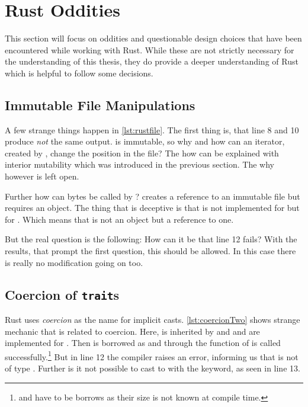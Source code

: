 \documentclass[thesis]{subfiles}
\begin{document}
\section{Rust Oddities}
  This section will focus on oddities and questionable design choices that have been encountered while working with Rust.
  While these are not strictly necessary for the understanding of this thesis, they do provide a deeper understanding of Rust which is helpful to follow some decisions.

  \subsection{Immutable File Manipulations}
    A few strange things happen in \autoref{lst:rustfile}.
    The first thing is, that line 8 and 10 produce \emph{not} the same output.
     is immutable, so why and how can an iterator, created by , change the position in the file?
    The how can be explained with interior mutability which was introduced in the previous section.
    The why however is left open.

    Further how can bytes be called by ?
     creates a reference to an immutable file but  requires an object.
    The thing that is deceptive is that \trait \Read is not implemented for \File but for .
    Which means that \self is not an object but a reference to one.

    But the real question is the following: How can it be that line 12 fails?
    With the results, that prompt the first question, this should be allowed.
    In this case there is really no modification going on too.


  \subsection{Coercion of \texttt{trait}s}
    Rust uses \emph{coercion} as the name for implicit casts.
    \autoref{lst:coercionTwo} shows strange mechanic that is related to coercion.
    Here, \A is inherited by \B and \B and \A are implemented for \Foo.
    Then  is borrowed as  and through  the function \fun of \A is called successfully.\footnote{
       and  have to be borrows as their size is not known at compile time.\autocite[E0277 referes to 19.4 Advanced Types]{rust-doc}
    }
    But in line 12 the compiler raises an error, informing us that  is not of type \A.
    Further is it not possible to cast  to  with the  keyword, as seen in line 13.
\end{document}
